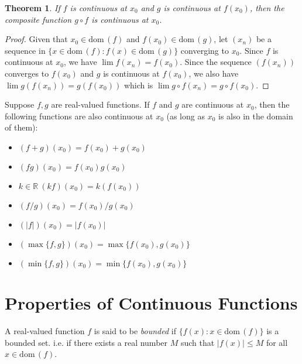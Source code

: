 \documentclass[12pt, lettersize]{book}
\theoremstyle{plain}
\newtheorem{thm}{Theorem}[section]
\theoremstyle{definition}
\theoremstyle{remark}
\newcommand{\R}{\mathbb{R}}
\newcommand{\dom}{\text{dom}\,}
\begin{document}
			\begin{thm}\label{def:17.5}
			If $f$ is continuous at $x_0$ and $g$ is continuous at $f(x_0)$, then the composite function $g\circ f$ is
			continuous at $x_0$.
			\end{thm}
			\begin{proof}
			Given that $x_0\in\dom(f)$ and $f(x_0)\in\dom(g)$, let $(x_n)$ be a sequence in $\{x\in\dom(f): f(x)\in\dom(g)\}$
			converging to $x_0$. Since $f$ is continuous at $x_0$, we have $\lim f(x_n)=f(x_0)$. Since the sequence $(f(x_n))$ converges to $f(x_0)$ and $g$ is continuous at $f(x_0)$, we also have $\lim g(f(x_n))=g(f(x_0))$ which
			is $\lim g\circ f(x_n)=g\circ f(x_0)$.
			\end{proof}
			
			\begin{tcolorbox}[title=Conclusion]
			Suppose $f,g$ are real-valued functions. If $f$ and $g$ are continuous at $x_0$, then the following functions are also continuous at $x_0$ (as long as $x_0$ is also in the domain of them):
			\begin{itemize}
				\item $(f+g)(x_0)=f(x_0)+g(x_0)$
				\item $(fg)(x_0)=f(x_0)g(x_0)$
				\item $k\in\R\ (kf)(x_0)=k(f(x_0))$
				\item $(f/g)(x_0)=f(x_0)/g(x_0)$
				\item $(|f|)(x_0)=|f(x_0)|$
				\item $(\max\{f,g\})(x_0)=\max\{f(x_0),g(x_0)\}$
				\item $(\min\{f,g\})(x_0)=\min\{f(x_0),g(x_0)\}$
			\end{itemize}
			\end{tcolorbox}
			
			
			\newpage
			
		\section{Properties of Continuous Functions}
			A real-valued function $f$ is said to be \emph{bounded} if $\{f(x): x\in\dom(f)\}$ is a bounded set. i.e. if
			there exists a real number $M$ such that $|f(x)|\leq M$ for all $x\in\dom(f)$.
			
\end{document}
